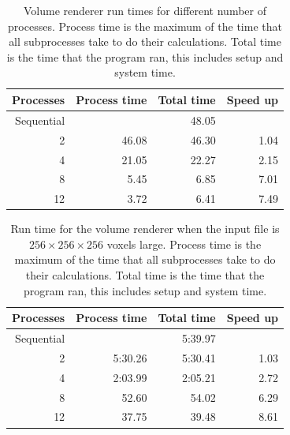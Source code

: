 \documentclass[a4paper]{article}
\begin{document}
\begin{table}[h]
	\centering
	\caption{Volume renderer run times for different number of processes. Process time is the maximum of the time that all subprocesses take to do their calculations. Total time is the time that the program ran, this includes setup and system time.}
	\label{tbl:render}
	\begin{tabular}{r|r|r|r}
		Processes & Process time & Total time & Speed up\\ \hline
		Sequential & & 48.05 \\
		 2 & 46.08 & 46.30 & 1.04 \\
		 4 & 21.05 & 22.27 & 2.15 \\
		 8 &  5.45 &  6.85 & 7.01 \\
		12 &  3.72 &  6.41 & 7.49
	\end{tabular}
\end{table}

\begin{table}[h]
	\centering
	\caption{Run time for the volume renderer when the input file is $256 \times 256 \times 256$ voxels large. Process time is the maximum of the time that all subprocesses take to do their calculations. Total time is the time that the program ran, this includes setup and system time.}
	\label{tbl:render2}
	\begin{tabular}{r|r|r|r}
		Processes & Process time & Total time & Speed up \\ \hline
		Sequential & & 5:39.97 & \\
		 2 & 5:30.26 & 5:30.41 & 1.03 \\
		 4 & 2:03.99 & 2:05.21 & 2.72 \\
		 8 &   52.60 &   54.02 & 6.29 \\
		12 &   37.75 &   39.48 & 8.61
	\end{tabular}
\end{table}
\end{document}
